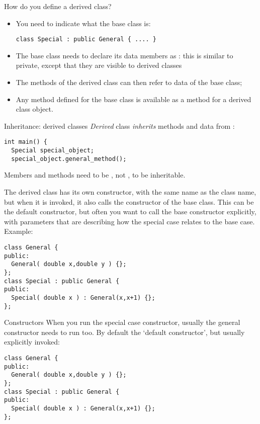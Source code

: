 How do you define a derived class?
\begin{itemize}
\item You need to indicate what the base class is:
\begin{lstlisting}
class Special : public General { .... }
\end{lstlisting}
\item The base class needs to declare its data members as
  : this is similar to private, except that
  they are visible to derived classes
\item The methods of the derived class can then refer to data of the
  base class;
\item Any method defined for the base class is available as a method
  for a derived class object.
\end{itemize}

\begin{slide}{Inheritance: derived classes}
  \label{sl:obj-derive}
  \emph{Derived} class 
  \emph{inherits} methods and data from
   :
\begin{lstlisting}
int main() {
  Special special_object;
  special_object.general_method();
\end{lstlisting}
Members and methods need to be , not , to be inheritable.
\end{slide}

The derived class has its own constructor, with the same name as the
class name, but when it is invoked, it also calls the constructor of
the base class. This can be the default constructor, but often you
want to call the base constructor explicitly, with parameters that are
describing how the special case relates to the base case. Example:
\begin{lstlisting}
class General {
public:
  General( double x,double y ) {};
};
class Special : public General {
public:
  Special( double x ) : General(x,x+1) {};
};
\end{lstlisting}

\begin{slide}{Constructors}
  \label{sl:obj-derive-construct}
  When you run the special case constructor, usually the general
  constructor needs to run too. By default the `default constructor',
  but usually explicitly invoked:
\begin{lstlisting}
class General {
public:
  General( double x,double y ) {};
};
class Special : public General {
public:
  Special( double x ) : General(x,x+1) {};
};
\end{lstlisting}
\end{slide}

